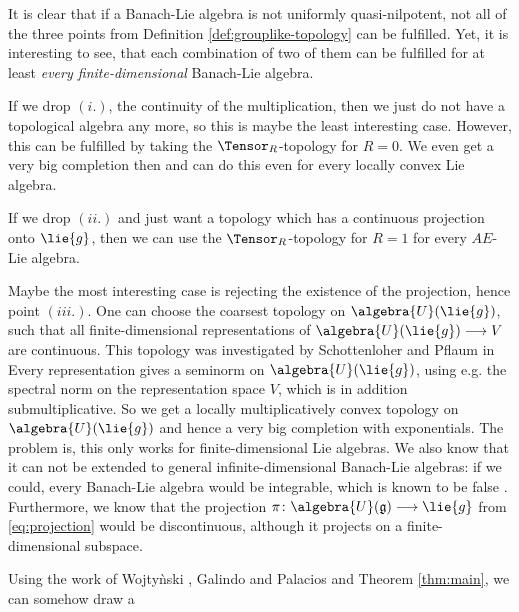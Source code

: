 \documentclass[
11pt,                          %
english                        %
]{article}
\begin{document}
\begin{remark}
	It is clear that if a Banach-Lie algebra is not uniformly quasi-nilpotent,
	not all of the three points from Definition \ref{def:grouplike-topology} can be
	fulfilled. Yet, it is interesting to see, that each combination of two of them
	can be fulfilled for at least \emph{every finite-dimensional} Banach-Lie 
	algebra.
	\begin{remarklist}
		\item
		If we drop $(i.)$, the continuity of the multiplication, then we just do not
		have a topological algebra any more, so this is maybe the least interesting
		case. However, this can be fulfilled by taking the $\Tensor_R$-topology for 
		$R = 0$. We even get a very big completion then and can do this even for
		every locally convex Lie algebra.
		
		\item
		If we drop $(ii.)$ and just want a topology which has a continuous 
		projection onto $\lie{g}$, then we can use the $\Tensor_R$-topology for 
		$R = 1$ for every $AE$-Lie algebra.

		\item
		Maybe the most interesting case is rejecting the existence of the 
		projection, hence point $(iii.)$. One can choose 
		the coarsest topology on $\algebra{U}(\lie{g})$, such that all 
		finite-dimensional representations of $\algebra{U}(\lie{g}) 
		\longrightarrow V$ are continuous. This topology was investigated by
		Schottenloher and Pflaum in \cite{pflaum.schottenloher:1998a}
		Every representation gives a seminorm on $\algebra{U}(\lie{g})$, using e.g.
		the spectral norm on the representation space $V$, which is in addition
		submultiplicative. So we get a locally multiplicatively convex topology
		on $\algebra{U}(\lie{g})$ and hence a very big completion with exponentials.
		The problem is, this only works for finite-dimensional Lie algebras. We also 
		know that it can not be extended to general infinite-dimensional Banach-Lie 
		algebras: if we could, every Banach-Lie algebra would be integrable, which 
		is known to be false \cite[Remark 1.14.15]{duistermaat.kolk:2000a}. 
		Furthermore, we know that the projection $\pi \colon
		\algebra{U}(\mathfrak{g}) \longrightarrow \lie{g}$ from
		\eqref{eq:projection} would be discontinuous, although it projects on a
		finite-dimensional subspace.
	\end{remarklist}
\end{remark}
Using the work of Wojty\`nski \cite{wojtynski:1998a}, Galindo and Palacios 
\cite{galindo.palacios:2012a} and Theorem \ref{thm:main}, we can somehow draw a 
\end{document}
